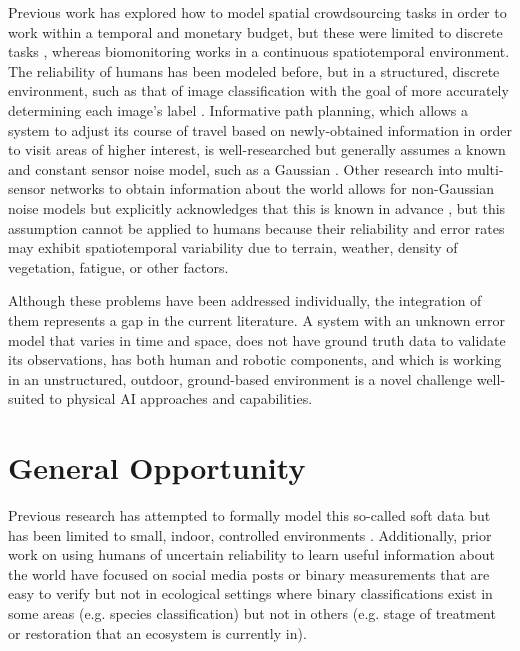 \documentclass{article}
\begin{document}
Previous work has explored how to model spatial crowdsourcing tasks in order to work within a temporal and monetary budget, but these were limited to discrete tasks \cite{10.1007/s00778-019-00568-7}, whereas biomonitoring works in a continuous spatiotemporal environment. The reliability of humans has been modeled before, but in a structured, discrete environment, such as that of image classification with the goal of more accurately determining each image’s label \cite{whose-vote-should-count-more}. Informative path planning, which allows a system to adjust its course of travel based on newly-obtained information in order to visit areas of higher interest, is well-researched but generally assumes a known and constant sensor noise model, such as a Gaussian \cite{informative-path-planning-framework}. Other research into multi-sensor networks to obtain information about the world allows for non-Gaussian noise models but explicitly acknowledges that this is known in advance \cite{mobile-sensor-network-control}, but this assumption cannot be applied to humans \cite{6846739} because their reliability and error rates may exhibit spatiotemporal variability due to terrain, weather, density of vegetation, fatigue, or other factors.

Although these problems have been addressed individually, the integration of them represents a gap in the current literature. A system with an unknown error model that varies in time and space, does not have ground truth data to validate its observations, has both human and robotic components, and which is working in an unstructured, outdoor, ground-based environment is a novel challenge well-suited to physical AI approaches and capabilities.


\section{General Opportunity}
Previous research has attempted to formally model this so-called soft data but has been limited to small, indoor, controlled environments \cite{6301744}. Additionally, prior work on using humans of uncertain reliability to learn useful information about the world have focused on social media posts \cite{6846739} or binary measurements that are easy to verify \cite{on-truth-discovery} but not in ecological settings where binary classifications exist in some areas (e.g. species classification) but not in others (e.g. stage of treatment or restoration that an ecosystem is currently in).
\end{document}
